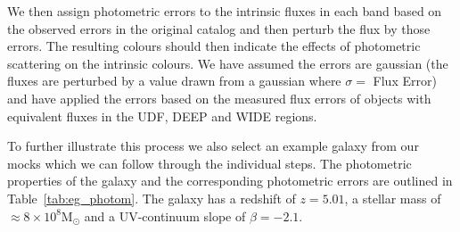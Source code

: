 We then assign photometric errors to the intrinsic fluxes in each band based on the observed errors in the original catalog and then perturb the flux by those errors. The resulting colours should then indicate the effects of photometric scattering on the intrinsic colours. We have assumed the errors are gaussian (the fluxes are perturbed by a value drawn from a gaussian where $\sigma =$ Flux Error) and have applied the errors based on the measured flux errors of objects with equivalent fluxes in the UDF, DEEP and WIDE regions. 

To further illustrate this process we also select an example galaxy from our mocks which we can follow through the individual steps. The photometric properties of the galaxy and the corresponding photometric errors are outlined in Table~\ref{tab:eg_photom}. The galaxy has a redshift of $z = 5.01$, a stellar mass of $\approx 8 \times 10^{8} \text{M}_{\odot}$ and a UV-continuum slope of $\beta = -2.1$.
 
